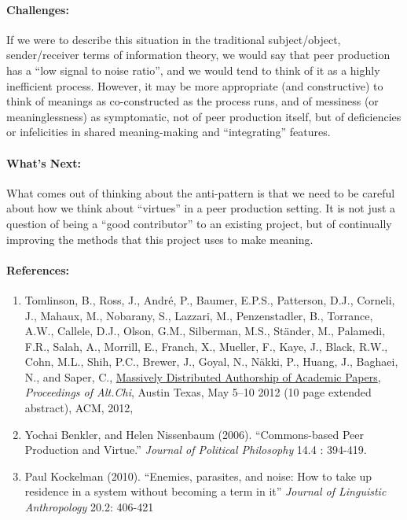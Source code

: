 \paragraph{Challenges:} If we were to describe this situation in the
traditional subject/object, sender/receiver terms of information theory,
we would say that peer production has a ``low signal to noise ratio'',
and we would tend to think of it as a highly inefficient process.
However, it may be more appropriate (and constructive) to think of
meanings as co-constructed as the process runs, and of messiness (or
meaninglessness) as symptomatic, not of peer production itself, but of
deficiencies or infelicities in shared meaning-making and
``integrating'' features.

\paragraph{What's Next:} What comes out of thinking about the anti-pattern
is that we need to be careful about how we think about ``virtues'' in a
peer production setting. It is not just a question of being a ``good
contributor'' to an existing project, but of continually improving the
methods that this project uses to make meaning.

\paragraph{References:}

\begin{enumerate}
\item
  Tomlinson, B., Ross, J., André, P., Baumer, E.P.S., Patterson, D.J.,
  Corneli, J., Mahaux, M., Nobarany, S., Lazzari, M., Penzenstadler, B.,
  Torrance, A.W., Callele, D.J., Olson, G.M., Silberman, M.S., Ständer,
  M., Palamedi, F.R., Salah, A., Morrill, E., Franch, X., Mueller, F.,
  Kaye, J., Black, R.W., Cohn, M.L., Shih, P.C., Brewer, J., Goyal, N.,
  Näkki, P., Huang, J., Baghaei, N., and Saper,
  C., \href{http://altchi.org/submissions/submission_wmt_0.pdf}{Massively
  Distributed Authorship of Academic Papers}, \emph{Proceedings of
  Alt.Chi}, Austin Texas, May 5--10 2012 (10 page extended abstract),
  ACM, 2012,
\item
  Yochai Benkler, and Helen Nissenbaum (2006). ``Commons-based Peer
  Production and Virtue.'' \emph{Journal of Political Philosophy} 14.4 :
  394-419.
\item
  Paul Kockelman (2010). ``Enemies, parasites, and noise: How to take up
  residence in a system without becoming a term in it'' \emph{Journal of
  Linguistic Anthropology} 20.2: 406-421
\end{enumerate}
